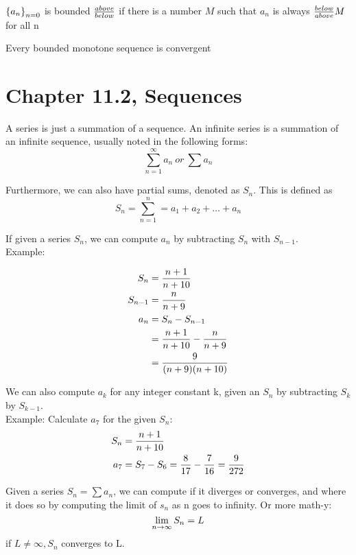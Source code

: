 \documentclass[17pt]{extarticle} %
\begin{document}
\begin{definition}
    $\left\{ a_n \right\}_{n=0}$ is bounded ${above \over below}$ if there is a number $M$ such that $a_n$ is always ${below \over above} M$ for all n
\end{definition}

\begin{theorem*}
    Every bounded monotone sequence is convergent

\end{theorem*}


\newpage
\section{Chapter 11.2, Sequences}

A series is just a summation of a sequence. An infinite series is a summation of an  infinite sequence, usually noted in the following forms:
$$
\sum^\infty_{n=1}a_n\ or\ \sum a_n
$$

Furthermore, we can also have partial sums, denoted as $S_n$. This is defined as 
$$
S_n = \sum^n_{n=1} = a_1 + a_2 + \ldots + a_n
$$

If given a series $S_n$, we can compute $a_n$ by subtracting $S_n$ with $S_{n-1}$. \\
Example:

$$
\begin{aligned}
    S_n &= {n+1 \over n+10} \\
S_{n-1} &= {n \over n+9} \\
a_n &= S_n - S_{n-1}  \\
&=  {n+1 \over n+10} - {n \over n+9} \\
&= {9 \over (n +9) (n + 10)}
\end{aligned}
$$


We can also compute $a_k$ for any integer constant k, given an $S_n$ by subtracting $S_k$ by $S_{k-1}$. \\
Example: 
Calculate $a_7$ for the given $S_n$:
$$
\begin{aligned}
    S_n &= {n + 1 \over n + 10} \\
    a_7 &= S_7 - S_6 = {8\over 17} - {7 \over 16} = {9\over 272}
\end{aligned}
$$

\begin{theorem*}
    Given a series $S_n = \sum a_n$, we can compute if it diverges or converges, and where it does so 
    by computing the limit of $s_n$ as n goes to infinity. Or more math-y: 
    $$
    \lim_{n\to \infty} S_n = L\\
    $$
    if $L \neq \infty , S_n $ converges to L.

\end{theorem*}
\end{document}

